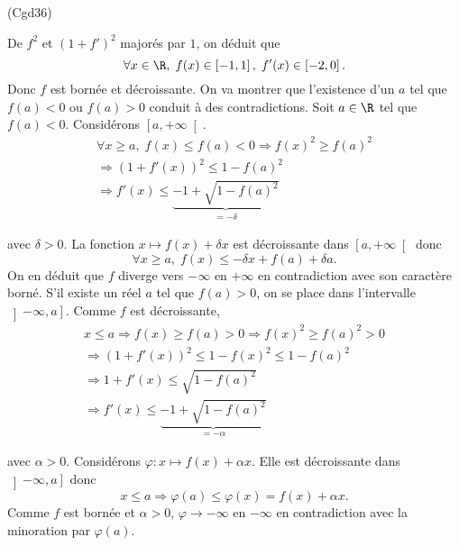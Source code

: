 \begin{tiny}(Cgd36)\end{tiny} De $f^2$ et $(1+f')^2$ majorés par $1$, on déduit que 
\[
  \forall x \in \R, \; f(x) \in \left[-1,1\right], \; f'(x) \in \left[-2,0\right].
\]
Donc $f$ est bornée et décroissante.\newline
On va montrer que l'existence d'un $a$ tel que $f(a) < 0$ ou $f(a) > 0$ conduit à des contradictions.\newline
Soit $a\in \R$ tel que $f(a)<0$. Considérons $\left[ a, +\infty\right[$.
\begin{multline*}
  \forall x \geq a,\; f(x) \leq f(a)<0
  \Rightarrow f(x)^2 \geq f(a)^2 \\
  \Rightarrow (1+f'(x))^2 \leq 1 - f(a)^2 \\
  \Rightarrow f'(x) \leq \underset{ = - \delta}{\underbrace{- 1 + \sqrt{1 - f(a)^2}}}
\end{multline*}

avec $\delta >0$. La fonction $x \mapsto f(x) + \delta x$ est décroissante dans $\left[ a, +\infty\right[$ donc
\[
  \forall x \geq a, \;
  f(x) \leq -\delta x + f(a) + \delta a .
\]
On en déduit que $f$ diverge vers $-\infty$ en $+\infty$ en contradiction avec son caractère borné.\newline
S'il existe un réel $a$ tel que $f(a)>0$, on se place dans l'intervalle $\left] - \infty, a \right]$. Comme $f$ est décroissante,
\begin{multline*}
  x  \leq a \Rightarrow f(x) \geq f(a) > 0 
  \Rightarrow f(x)^2 \geq f(a)^2 > 0\\
  \Rightarrow (1+f'(x))^2 \leq 1 - f(x)^2 \leq 1 - f(a)^2 \\
  \Rightarrow  1 + f'(x) \leq \sqrt{1-f(a)^2}\\
  \Rightarrow f'(x) \leq \underset{=-\alpha}{\underbrace{-1 +\sqrt{1-f(a)^2}}}
\end{multline*}

avec $\alpha >0$. Considérons $\varphi: x\mapsto f(x) + \alpha x$.\newline
Elle est décroissante dans $\left] - \infty, a \right]$ donc
\[
  x \leq a \Rightarrow \varphi (a) \leq \varphi(x) = f(x) + \alpha x .
\]
Comme $f$ est bornée et $\alpha > 0$, $\varphi \rightarrow - \infty$ en $-\infty$ en contradiction avec la minoration par $\varphi(a)$.
